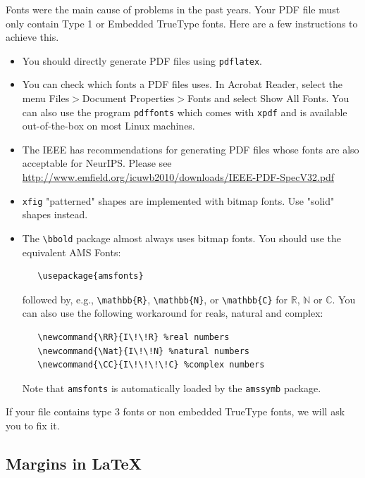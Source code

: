\documentclass{article}
\begin{document}
Fonts were the main cause of problems in the past years. Your PDF file must only
contain Type 1 or Embedded TrueType fonts. Here are a few instructions to
achieve this.


\begin{itemize}


\item You should directly generate PDF files using \verb+pdflatex+.


\item You can check which fonts a PDF files uses.  In Acrobat Reader, select the
  menu Files$>$Document Properties$>$Fonts and select Show All Fonts. You can
  also use the program \verb+pdffonts+ which comes with \verb+xpdf+ and is
  available out-of-the-box on most Linux machines.


\item The IEEE has recommendations for generating PDF files whose fonts are also
  acceptable for NeurIPS. Please see
  \url{http://www.emfield.org/icuwb2010/downloads/IEEE-PDF-SpecV32.pdf}


\item \verb+xfig+ "patterned" shapes are implemented with bitmap fonts.  Use
  "solid" shapes instead.


\item The \verb+\bbold+ package almost always uses bitmap fonts.  You should use
  the equivalent AMS Fonts:
\begin{verbatim}
   \usepackage{amsfonts}
\end{verbatim}
followed by, e.g., \verb+\mathbb{R}+, \verb+\mathbb{N}+, or \verb+\mathbb{C}+
for $\mathbb{R}$, $\mathbb{N}$ or $\mathbb{C}$.  You can also use the following
workaround for reals, natural and complex:
\begin{verbatim}
   \newcommand{\RR}{I\!\!R} %real numbers
   \newcommand{\Nat}{I\!\!N} %natural numbers
   \newcommand{\CC}{I\!\!\!\!C} %complex numbers
\end{verbatim}
Note that \verb+amsfonts+ is automatically loaded by the \verb+amssymb+ package.


\end{itemize}


If your file contains type 3 fonts or non embedded TrueType fonts, we will ask
you to fix it.


\subsection{Margins in \LaTeX{}}
\end{document}
